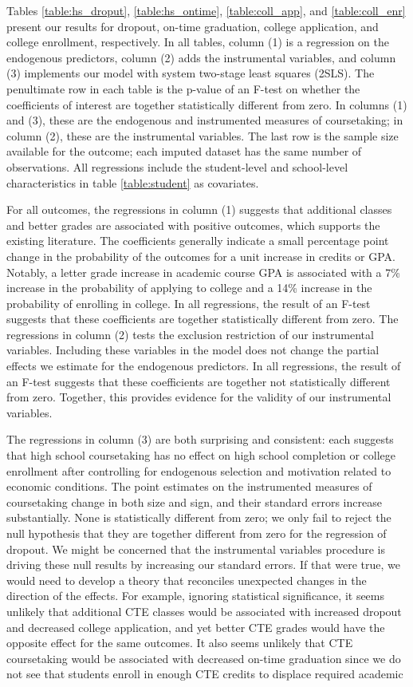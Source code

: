 \documentclass[letterpaper, 12pt]{article}
\begin{document}
Tables \ref{table:hs_droput}, \ref{table:hs_ontime}, \ref{table:coll_app}, and \ref{table:coll_enr} present our results for dropout, on-time graduation, college application, and college enrollment, respectively. In all tables, column (1) is a regression on the endogenous predictors, column (2) adds the instrumental variables, and column (3) implements our model with system two-stage least squares (2SLS). The penultimate row in each table is the p-value of an F-test on whether the coefficients of interest are together statistically different from zero. In columns (1) and (3), these are the endogenous and instrumented measures of coursetaking; in column (2), these are the instrumental variables. The last row is the sample size available for the outcome; each imputed dataset has the same number of observations. All regressions include the student-level and school-level characteristics in table \ref{table:student} as covariates.

For all outcomes, the regressions in column (1) suggests that additional classes and better grades are associated with positive outcomes, which supports the existing literature. The coefficients generally indicate a small percentage point change in the probability of the outcomes for a unit increase in credits or GPA. Notably, a letter grade increase in academic course GPA is associated with a 7\% increase in the probability of applying to college and a 14\% increase in the probability of enrolling in college. In all regressions, the result of an F-test suggests that these coefficients are together statistically different from zero. The regressions in column (2) tests the exclusion restriction of our instrumental variables. Including these variables in the model does not change the partial effects we estimate for the endogenous predictors. In all regressions, the result of an F-test suggests that these coefficients are together not statistically different from zero. Together, this provides evidence for the validity of our instrumental variables.

The regressions in column (3) are both surprising and consistent: each suggests that high school coursetaking has no effect on high school completion or college enrollment after controlling for endogenous selection and motivation related to economic conditions. The point estimates on the instrumented measures of coursetaking change in both size and sign, and their standard errors increase substantially. None is statistically different from zero; we only fail to reject the null hypothesis that they are together different from zero for the regression of dropout. We might be concerned that the instrumental variables procedure is driving these null results by increasing our standard errors. If that were true, we would need to develop a theory that reconciles unexpected changes in the direction of the effects. For example, ignoring statistical significance, it seems unlikely that additional CTE classes would be associated with increased dropout and decreased college application, and yet better CTE grades would have the opposite effect for the same outcomes. It also seems unlikely that CTE coursetaking would be associated with decreased on-time graduation since we do not see that students enroll in enough CTE credits to displace required academic
\end{document}
